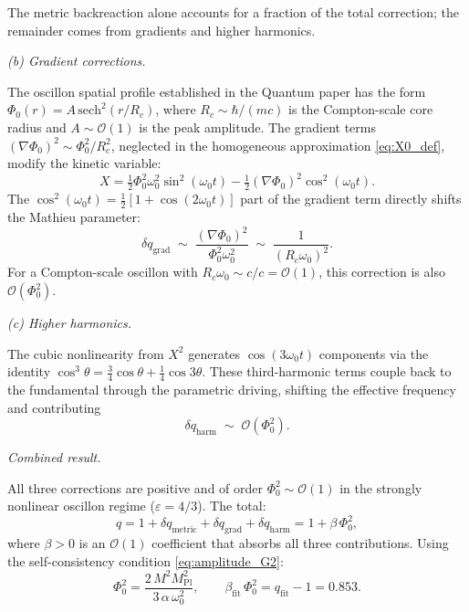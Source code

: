 \documentclass[11pt]{article}
\begin{document}
\smallskip
The metric backreaction alone accounts for
a fraction of the total correction; the
remainder comes from gradients and higher harmonics.

\medskip
\textit{(b) Gradient corrections.}

The oscillon spatial profile established in the
Quantum paper has the form
$\Phi_0(r) = A\,\mathrm{sech}^2(r/R_c)$, where
$R_c \sim \hbar/(mc)$ is the Compton-scale core
radius and $A \sim \mathcal{O}(1)$ is the peak
amplitude. The gradient terms
$(\nabla\Phi_0)^2 \sim \Phi_0^2/R_c^2$, neglected
in the homogeneous approximation
\eqref{eq:X0_def}, modify the kinetic variable:
\begin{equation}
  X = \tfrac{1}{2}\Phi_0^2\omega_0^2\sin^2(\omega_0 t)
  - \tfrac{1}{2}(\nabla\Phi_0)^2\cos^2(\omega_0 t).
\end{equation}
The $\cos^2(\omega_0 t) = \frac{1}{2}
[1 + \cos(2\omega_0 t)]$ part of the gradient term
directly shifts the Mathieu parameter:
\begin{equation}
  \delta q_{\mathrm{grad}}
  \;\sim\;
  \frac{(\nabla\Phi_0)^2}{\Phi_0^2\omega_0^2}
  \;\sim\;
  \frac{1}{(R_c\omega_0)^2}.
  \label{eq:dq_grad}
\end{equation}
For a Compton-scale oscillon with
$R_c\omega_0 \sim c/c = \mathcal{O}(1)$, this
correction is also $\mathcal{O}(\Phi_0^2)$.

\medskip
\textit{(c) Higher harmonics.}

The cubic nonlinearity from $X^2$ generates
$\cos(3\omega_0 t)$ components via the identity
$\cos^3\theta = \frac{3}{4}\cos\theta
+ \frac{1}{4}\cos 3\theta$.
These third-harmonic terms couple back to the
fundamental through the parametric driving,
shifting the effective frequency and contributing
\begin{equation}
  \delta q_{\mathrm{harm}}
  \;\sim\;
  \mathcal{O}(\Phi_0^2).
  \label{eq:dq_harm}
\end{equation}

\medskip
\textit{Combined result.}

All three corrections are positive and of order
$\Phi_0^2 \sim \mathcal{O}(1)$ in the strongly
nonlinear oscillon regime
($\varepsilon = 4/3$). The total:
\begin{equation}
  \boxed{
  q = 1 + \delta q_{\mathrm{metric}}
  + \delta q_{\mathrm{grad}}
  + \delta q_{\mathrm{harm}}
  = 1 + \beta\,\Phi_0^2,
  }
  \label{eq:q_corrected}
\end{equation}
where $\beta > 0$ is an $\mathcal{O}(1)$ coefficient
that absorbs all three contributions. Using the
self-consistency condition \eqref{eq:amplitude_G2}:
\begin{equation}
  \Phi_0^2
  = \frac{2\,M^2 M_{\mathrm{Pl}}^2}
  {3\,\alpha\,\omega_0^2},
  \qquad
  \beta_{\mathrm{fit}}\,\Phi_0^2
  = q_{\mathrm{fit}} - 1 = 0.853.
  \label{eq:amplitude_constraint}
\end{equation}
\end{document}
